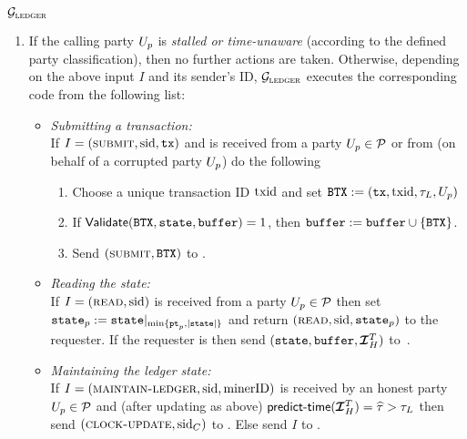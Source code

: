 \begin{systembox}{$\mathcal{G}_{\textsc{ledger}}$}
\begin{enumerate}
      \item If the calling party ${U_p}$ is \emph{stalled or time-unaware}
      (according to the defined party classification), then no further actions
      are taken. Otherwise, depending on the above input $I$ and its sender's
      ID, $\mathcal{G}_{\textsc{ledger}}$ executes the corresponding code from the following list:
      \begin{itemize}
        \let\labelitemi\labelitemii
        \item \emph{Submitting a transaction:}\\
        If $I=(\textsc{submit}, \text{sid},\texttt{tx})$ and is received from a party ${U_p} \in
        \mathcal{P}$ or from \Adv (on behalf of a corrupted party ${U_p}$) do the
        following%
        \begin{enumerate}\setlength\itemsep{1ex}
          \item Choose a unique transaction ID $\text{txid}$ and set
          $\texttt{BTX}:=(\texttt{tx},\text{txid},\tau_L,{U_p})$
          \item If $\textsf{Validate}(\texttt{BTX},\texttt{state},\texttt{buffer})=1$, then
          $\texttt{buffer}:=\texttt{buffer}\cup\{\texttt{BTX}\}$.
          \item Send $(\textsc{submit}, \texttt{BTX})$ to \Adv.%
        \end{enumerate}

        \item \emph{Reading the state:}\\ If $I=(\textsc{read}, \text{sid})$ is received
        from a party ${U_p} \in \mathcal{P}$ then set $\texttt{state}_p:=
        \texttt{state}|_{\min\{\texttt{pt}_p,|\texttt{state}|\}}$ and return $(\textsc{read}, \text{sid}, \texttt{state}_p)$
        to the requester. If the requester is \Adv then send
        $(\state,\buffer,\TIH)$ to~\Adv.%

        \item \emph{Maintaining the ledger state:}\\
        If $I=(\textsc{maintain-ledger},\text{sid}, \text{minerID})$ is received by an honest party
        ${U_p}\in\mathcal{P}$ and  (after updating \TIH  as above)
        $\vsync(\TIH)=\hat{\tau}>\LFtau$ then send $(\textsc{clock-update}, \text{sid}_C)$ to
        \Fclock. Else send $I$ to \Adv.%



\end{itemize}
\end{enumerate}
\end{systembox}
